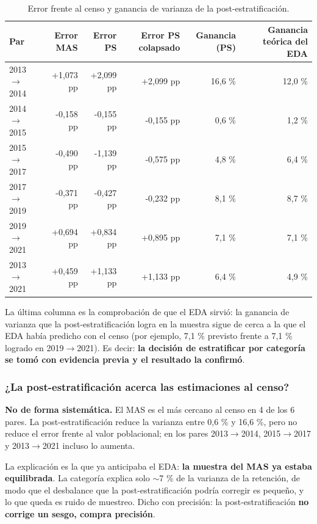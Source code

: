 \begin{table}[H]
  \centering
  \footnotesize
  \caption{Error frente al censo y ganancia de varianza de la post-estratificación.}
  \label{tab:mues-errores}
  \begin{tabular}{@{}lrrrrr@{}}
    \toprule
    \textbf{Par} & \textbf{Error MAS} & \textbf{Error PS} & \textbf{Error PS colapsado}
      & \textbf{Ganancia (PS)} & \textbf{Ganancia teórica del EDA} \\
    \midrule
    2013$\rightarrow$2014 & +1,073 pp & +2,099 pp & +2,099 pp & 16,6 \% & 12,0 \% \\
    2014$\rightarrow$2015 & -0,158 pp & -0,155 pp & -0,155 pp & 0,6 \% & 1,2 \% \\
    2015$\rightarrow$2017 & -0,490 pp & -1,139 pp & -0,575 pp & 4,8 \% & 6,4 \% \\
    2017$\rightarrow$2019 & -0,371 pp & -0,427 pp & -0,232 pp & 8,1 \% & 8,7 \% \\
    2019$\rightarrow$2021 & +0,694 pp & +0,834 pp & +0,895 pp & 7,1 \% & 7,1 \% \\
    2013$\rightarrow$2021 & +0,459 pp & +1,133 pp & +1,133 pp & 6,4 \% & 4,9 \% \\
    \bottomrule
  \end{tabular}
\end{table}

La última columna es la comprobación de que el EDA sirvió: la ganancia de
varianza que la post-estratificación logra en la muestra sigue de cerca a la que
el EDA había predicho con el censo (por ejemplo, 7,1 \% previsto frente a
7,1 \% logrado en 2019$\rightarrow$2021). Es decir: \textbf{la decisión de
estratificar por categoría se tomó con evidencia previa y el resultado la
confirmó}.

\subsubsection{¿La post-estratificación acerca las estimaciones al censo?}

\textbf{No de forma sistemática.} El MAS es el más cercano al censo en 4 de los
6 pares. La post-estratificación reduce la varianza entre 0,6 \% y 16,6 \%, pero
no reduce el error frente al valor poblacional; en los pares
2013$\rightarrow$2014, 2015$\rightarrow$2017 y 2013$\rightarrow$2021 incluso lo
aumenta.

La explicación es la que ya anticipaba el EDA: \textbf{la muestra del MAS ya
estaba equilibrada}. La categoría explica solo $\sim$7 \% de la varianza de la
retención, de modo que el desbalance que la post-estratificación podría corregir
es pequeño, y lo que queda es ruido de muestreo. Dicho con precisión: la
post-estratificación \textbf{no corrige un sesgo, compra precisión}.


